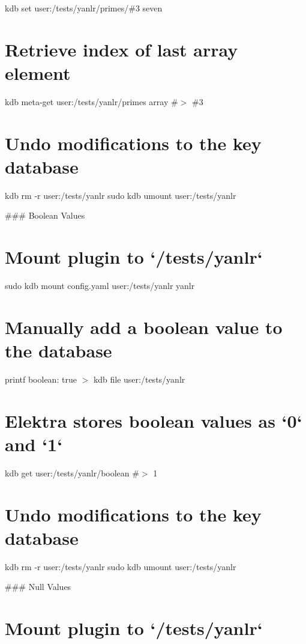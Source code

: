 kdb set user\+:/tests/yanlr/primes/\#3 seven\hypertarget{autotoc_md897_autotoc_md913}{}\section{Retrieve index of last array element}\label{autotoc_md897_autotoc_md913}
kdb meta-\/get user\+:/tests/yanlr/primes array \#$>$ \#3\hypertarget{autotoc_md897_autotoc_md914}{}\section{Undo modifications to the key database}\label{autotoc_md897_autotoc_md914}
kdb rm -\/r user\+:/tests/yanlr sudo kdb umount user\+:/tests/yanlr 
\begin{DoxyCode}
### Boolean Values
\end{DoxyCode}
 \hypertarget{autotoc_md897_autotoc_md915}{}\section{Mount plugin to `/tests/yanlr`}\label{autotoc_md897_autotoc_md915}
sudo kdb mount config.\+yaml user\+:/tests/yanlr yanlr\hypertarget{autotoc_md897_autotoc_md916}{}\section{Manually add a boolean value to the database}\label{autotoc_md897_autotoc_md916}
printf \textquotesingle{}boolean\+: true\textquotesingle{} $>$ {\ttfamily kdb file user\+:/tests/yanlr}\hypertarget{autotoc_md897_autotoc_md917}{}\section{Elektra stores boolean values as `0` and `1`}\label{autotoc_md897_autotoc_md917}
kdb get user\+:/tests/yanlr/boolean \#$>$ 1\hypertarget{autotoc_md897_autotoc_md918}{}\section{Undo modifications to the key database}\label{autotoc_md897_autotoc_md918}
kdb rm -\/r user\+:/tests/yanlr sudo kdb umount user\+:/tests/yanlr 
\begin{DoxyCode}
### Null Values
\end{DoxyCode}
 \hypertarget{autotoc_md897_autotoc_md919}{}\section{Mount plugin to `/tests/yanlr`}\label{autotoc_md897_autotoc_md919}
